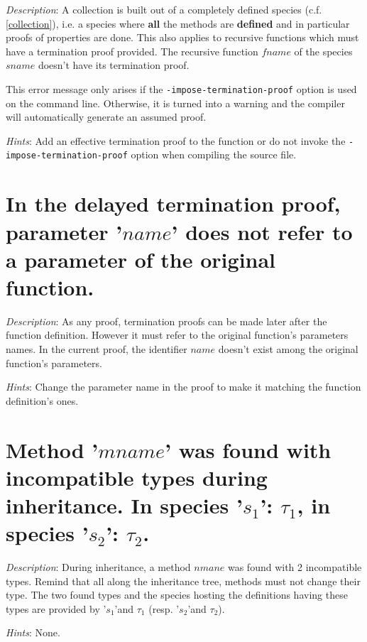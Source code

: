 {\em Description}: A collection is built  out of a completely defined species
(c.f. \ref{collection}), i.e. a species where {\bf all} the methods
are {\bf defined} and in particular proofs of properties are
done. This also applies to recursive functions which must have a
termination proof provided. The recursive function $fname$ of the
species $sname$ doesn't have its termination proof.

This error message only arises if the {\tt -impose-termination-proof}
option is used on the command line. Otherwise, it is turned into a
warning and the compiler will automatically generate an assumed
proof.

{\em Hints}: Add an effective termination proof to the function or do
not invoke the {\tt -impose-termination-proof} option when compiling
the source file.



\section*{In the delayed termination proof, parameter '$name$' does
  not refer to a parameter of the original function.}

{\em Description}: As any proof, termination proofs can be made later
after the function definition. However it must refer to the original
function's parameters names. In the current proof, the identifier
$name$ doesn't exist among the original function's parameters.

{\em Hints}: Change the parameter name in the proof to make it
matching the function definition's ones.



\section*{Method '$mname$' was found with incompatible types during
  inheritance. In species '$s_1$': $\tau_1$, in species '$s_2$':
  $\tau_2$.}

{\em Description}: During inheritance, a method $nmane$ was found with
2 incompatible types. Remind that all along the inheritance tree,
methods must not change their type. The two found types and the
species hosting the definitions having these types are provided by
'$s_1$'and $\tau_1$ (resp. '$s_2$'and $\tau_2$).

{\em Hints}: None.



